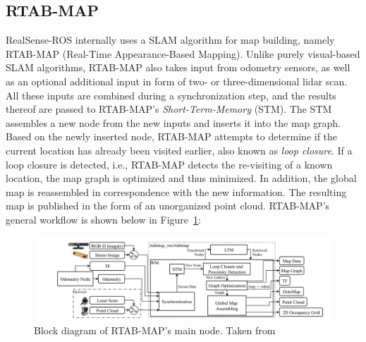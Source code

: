 \documentclass[main.tex]{subfiles}
\begin{document}
\subsection*{RTAB-MAP}
RealSense-ROS internally uses a SLAM algorithm for map building, namely RTAB-MAP (Real-Time Appearance-Based Mapping)\cite{Labbé_Michaud_2019}.
Unlike purely visual-based SLAM algorithms, RTAB-MAP also takes input from odometry sensors, as well as an optional additional input in form of two- or three-dimensional
lidar scan.
All these inputs are combined during a synchronization step, and the results thereof are passed to RTAB-MAP's \textit{Short-Term-Memory} (STM).
The STM assembles a new node from the new inputs and inserts it into the map graph. Based on the newly inserted node, RTAB-MAP attempts to determine if the current location has already been visited earlier, also known as \textit{loop closure}.
If a loop closure is detected, i.e., RTAB-MAP detects the re-visiting of a known location, the map graph is optimized and thus minimized. In addition, the global map is reassembled in correspondence with the new information.
The resulting map is published in the form of an unorganized point cloud.
RTAB-MAP's general workflow is shown below in Figure~\ref{fig:rtabmap}:
\begin{figure}[!h]
    \centering
    \includegraphics[width=15 cm]{images/rtabmap.png}
    \caption[RTAB-MAP Block Diagram]{Block diagram of RTAB-MAP's main node. Taken from \cite[Figure~1]{Labbé_Michaud_2019}}
    \label{fig:rtabmap}
\end{figure}
\end{document}
